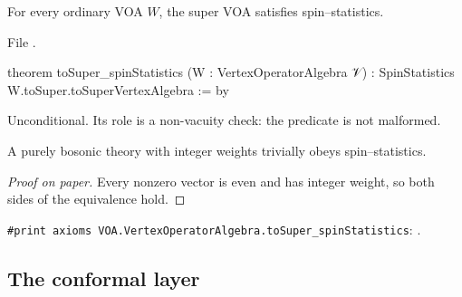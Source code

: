 \begin{theorem}\label{l17:thm:tosuperspin}
For every ordinary VOA $W$, the super VOA  satisfies spin--statistics.
\end{theorem}
\noindent File .
\begin{leancode}
theorem toSuper_spinStatistics (W : VertexOperatorAlgebra 𝒱) :
    SpinStatistics W.toSuper.toSuperVertexAlgebra := by
\end{leancode}
\begin{dictionary}
Unconditional. Its role is a non-vacuity check: the predicate is not malformed.
\end{dictionary}
\begin{physics}
A purely bosonic theory with integer weights trivially obeys spin--statistics.
\end{physics}
\begin{proof}[Proof on paper]
Every nonzero vector is even and has integer weight, so both sides of the equivalence hold.
\end{proof}
\begin{status}
\texttt{\#print axioms VOA.VertexOperatorAlgebra.toSuper\_spinStatistics}: .
\end{status}

\subsection{The conformal layer}

